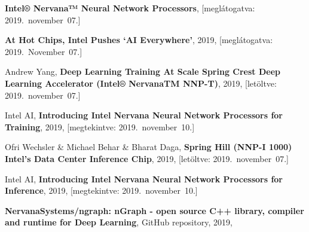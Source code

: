 \begin{thebibliography}{9}
	\textbf{Intel® Nervana™ Neural Network Processors},
	[meglátogatva: 2019.~november~07.]



	\textbf{At Hot Chips, Intel Pushes ‘AI Everywhere’},
	2019,
	[meglátogatva: 2019.~November~07.]

	Andrew Yang,
	\textbf{Deep Learning Training At Scale	Spring Crest Deep Learning Accelerator (Intel® NervanaTM NNP-T)},
	2019,
	[letöltve: 2019.~november~07.]

	Intel AI,
	\textbf{Introducing Intel Nervana Neural Network Processors for Training},
	2019,
	[megtekintve: 2019.~november~10.]

	Ofri Wechsler \& Michael Behar \& Bharat Daga,
	\textbf{Spring Hill (NNP-I 1000) Intel’s Data Center Inference Chip},
	2019,
	[letöltve: 2019.~november~07.]

	Intel AI,
	\textbf{Introducing Intel Nervana Neural Network Processors for Inference},
	2019,
	[megtekintve: 2019.~november~10.]


	\textbf{NervanaSystems/ngraph: nGraph - open source C++ library, compiler and runtime for Deep Learning},
	GitHub repository,
	2019,


\end{thebibliography}
